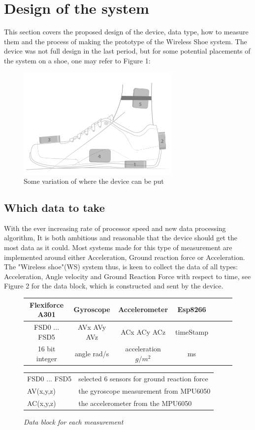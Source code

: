 \documentclass[12pt,a4paper]{article}
\begin{document}
\section{Design of the system}
\hspace{10mm}This section covers the proposed design of the device, data type, how to measure them and the process of making the prototype of the Wireless Shoe system. The device was not full design in the last period, but for some potential placements of the system on a shoe, one may refer to Figure 1:
\begin{figure}[hbt!]
\begin{center}
\includegraphics[scale=1]{SPlacement.png}
\caption{Some variation of where the device can be put \cite{Splacement}}
\end{center}
\end{figure}
\subsection{Which data to take}
\hspace{10mm} With the ever increasing rate of processor speed and new data processing algorithm, It is both ambitious and reasonable that the device should get the most data as it could. Most systems made for this type of measurement are implemented around either Acceleration, Ground reaction force or Acceleration\cite{acc1,And03astudy}. The "Wireless shoe"(WS) system thus, is keen to collect the data of all types: Acceleration, Angle velocity and Ground Reaction Force with respect to time, see Figure 2 for the data block, which is constructed and sent by the device.\\
\begin{figure}
\begin{center}
\begin{tabular}{|c|c|c|c|c|c|c}
	\hline
	Flexiforce A301 & Gyroscope & Accelerometer & Esp8266\\
	\hline	
	FSD0 ... FSD5 & AVx AVy AVz & ACx ACy ACz & timeStamp\\
	\hline
	16 bit integer&angle rad/s&acceleration $g/m^2$&ms\\
	\hline
\end{tabular}
\end{center}
\begin{tabular}{l l}
FSD0 ... FSD5	& selected 6 sensors for ground reaction force\\
AV(x,y,z)    	& the gyroscope measurement from MPU6050\\
AC(x,y,z)    	& the accelerometer from the MPU6050
\end{tabular}
\caption{\textit{Data block for each measurement}}
\end{figure} 
\end{document}
